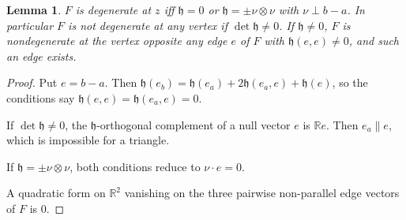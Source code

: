 \documentclass[11pt]{article}
\newtheorem{lemma}[theorem]{Lemma}
\theoremstyle{definition}
\newcommand{\R}{\mathbb R}
\newcommand{\hh}{\mathfrak h}
\begin{document}
\begin{lemma}\label{l:degface}
$F$ is degenerate at $z$ iff $\hh=0$ or $\hh=\pm\nu\otimes\nu$ with $\nu\perp b-a$. In particular $F$ is not degenerate at any vertex if $\det\hh\neq0$. If $\hh\neq0$, $F$ is nondegenerate at the vertex opposite any edge $e$ of $F$ with $\hh(e,e)\neq0$, and such an edge exists.
\end{lemma}
\begin{proof}
Put $e=b-a$. Then $\hh(e_b)=\hh(e_a)+2\hh(e_a,e)+\hh(e)$, so the conditions say $\hh(e,e)=\hh(e_a,e)=0$.

If $\det\hh\ne0$, the $\hh$-orthogonal complement of a null vector $e$ is $\R e$. Then $e_a\parallel e$, which is impossible for a triangle.

If $\hh=\pm\nu\otimes\nu$, both conditions reduce to $\nu\cdot e=0$.

A quadratic form on $\R^2$ vanishing on the three pairwise non-parallel edge vectors of $F$ is $0$.
\end{proof}
\end{document}
